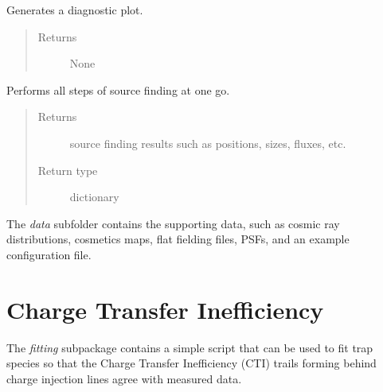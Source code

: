 \documentclass[a4paper,12pt,english]{sphinxmanual}
\begin{document}
\begin{fulllineitems}
\begin{fulllineitems}
\end{fulllineitems}


\begin{fulllineitems}
\label{analysis:analysis.sourceFinder.sourceFinder.plot}
Generates a diagnostic plot.
\begin{quote}\begin{description}
\item[{Returns}] \leavevmode
None

\end{description}\end{quote}

\end{fulllineitems}


\begin{fulllineitems}
\label{analysis:analysis.sourceFinder.sourceFinder.runAll}
Performs all steps of source finding at one go.
\begin{quote}\begin{description}
\item[{Returns}] \leavevmode
source finding results such as positions, sizes, fluxes, etc.

\item[{Return type}] \leavevmode
dictionary

\end{description}\end{quote}

\end{fulllineitems}


\end{fulllineitems}


The \emph{data} subfolder contains the supporting data, such as cosmic ray distributions, cosmetics maps,
flat fielding files, PSFs, and an example configuration file.


\chapter{Charge Transfer Inefficiency}
\label{index:charge-transfer-inefficiency}
The \emph{fitting} subpackage contains a simple script that can be used to fit trap species so that the
Charge Transfer Inefficiency (CTI) trails forming behind charge injection lines agree with measured data.
\end{document}
